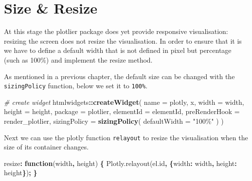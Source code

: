 \documentclass[
]{krantz}
\makeatletter
\newenvironment{Shaded}{\begin{snugshade}}{\end{snugshade}}
\newcommand{\AttributeTok}[1]{\textcolor[rgb]{0.61,0.61,0.61}{#1}}
\newcommand{\CommentTok}[1]{\textcolor[rgb]{0.37,0.37,0.37}{\textit{#1}}}
\newcommand{\DataTypeTok}[1]{\textcolor[rgb]{0.27,0.27,0.27}{#1}}
\newcommand{\KeywordTok}[1]{\textcolor[rgb]{0.27,0.27,0.27}{\textbf{#1}}}
\newcommand{\NormalTok}[1]{#1}
\newcommand{\OperatorTok}[1]{\textcolor[rgb]{0.43,0.43,0.43}{\textbf{#1}}}
\newcommand{\StringTok}[1]{\textcolor[rgb]{0.5,0.5,0.5}{#1}}
\newcommand{\VariableTok}[1]{\textcolor[rgb]{0,0,0}{#1}}
\newenvironment{kframe}{%
\medskip{}
\setlength{\fboxsep}{.8em}
 \def\at@end@of@kframe{}%
 \ifinner\ifhmode%
  \def\at@end@of@kframe{\end{minipage}}%
  \begin{minipage}{\columnwidth}%
 \fi\fi%
 \def\FrameCommand##1{\hskip\@totalleftmargin \hskip-\fboxsep
 \colorbox{shadecolor}{##1}\hskip-\fboxsep
     \hskip-\linewidth \hskip-\@totalleftmargin \hskip\columnwidth}%
 \MakeFramed {\advance\hsize-\width
   \@totalleftmargin\z@ \linewidth\hsize
   \@setminipage}}%
 {\par\unskip\endMakeFramed%
 \at@end@of@kframe}
\renewenvironment{Shaded}{\begin{kframe}}{\end{kframe}}
\makeatother
\begin{document}
\hypertarget{widgets-ex-plotly-sizing}{%
\section{Size \& Resize}\label{widgets-ex-plotly-sizing}}

At this stage the plotlier package does yet provide responsive visualisation: resizing the screen does not resize the visualisation. In order to ensure that it is we have to define a default width that is not defined in pixel but percentage (such as 100\%) and implement the resize method.

As mentioned in a previous chapter, the default size can be changed with the \texttt{sizingPolicy} function, below we set it to \texttt{100\%}.

\begin{Shaded}
\begin{Highlighting}[]
\CommentTok{\# create widget}
\NormalTok{htmlwidgets}\OperatorTok{::}\KeywordTok{createWidget}\NormalTok{(}
  \DataTypeTok{name =} \StringTok{\textquotesingle{}plotly\textquotesingle{}}\NormalTok{,}
\NormalTok{  x,}
  \DataTypeTok{width =}\NormalTok{ width,}
  \DataTypeTok{height =}\NormalTok{ height,}
  \DataTypeTok{package =} \StringTok{\textquotesingle{}plotlier\textquotesingle{}}\NormalTok{,}
  \DataTypeTok{elementId =}\NormalTok{ elementId,}
  \DataTypeTok{preRenderHook =}\NormalTok{ render\_plotlier,}
  \DataTypeTok{sizingPolicy =} \KeywordTok{sizingPolicy}\NormalTok{(}
    \DataTypeTok{defaultWidth =} \StringTok{"100\%"}
\NormalTok{  )}
\NormalTok{)}
\end{Highlighting}
\end{Shaded}

Next we can use the plotly function \texttt{relayout} to resize the visualisation when the size of its container changes.

\begin{Shaded}
\begin{Highlighting}[]
\NormalTok{resize}\OperatorTok{:} \KeywordTok{function}\NormalTok{(width}\OperatorTok{,}\NormalTok{ height) }\OperatorTok{\{}
  \VariableTok{Plotly}\NormalTok{.}\AttributeTok{relayout}\NormalTok{(}\VariableTok{el}\NormalTok{.}\AttributeTok{id}\OperatorTok{,} \OperatorTok{\{}\DataTypeTok{width}\OperatorTok{:}\NormalTok{ width}\OperatorTok{,} \DataTypeTok{height}\OperatorTok{:}\NormalTok{ height}\OperatorTok{\}}\NormalTok{)}\OperatorTok{;}
\OperatorTok{\}}
\end{Highlighting}
\end{Shaded}
\end{document}
